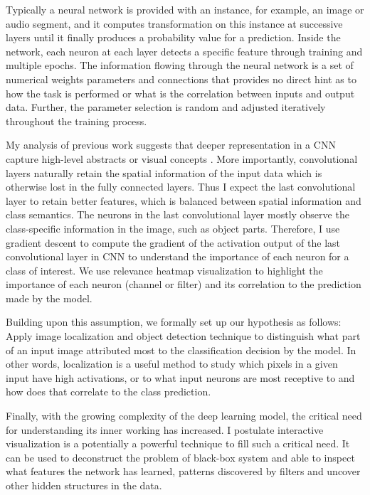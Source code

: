 Typically a neural network is provided with an instance, for example, an image or audio segment, and it computes transformation on this instance at successive layers until it finally produces a probability value for a prediction. Inside the network, each neuron at each layer detects a specific feature through training and multiple epochs. The information flowing through the neural network is a set of numerical weights parameters and connections that provides no direct hint as to how the task is performed or what is the correlation between inputs and output data. Further, the parameter selection is random and adjusted iteratively throughout the training process.

My analysis of previous work suggests that deeper representation in a CNN capture high-level abstracts or visual concepts \cite{Zeiler}. More importantly, convolutional layers naturally retain the spatial information of the input data which is otherwise lost in the fully connected layers. Thus I expect the last convolutional layer to retain better features, which is balanced between spatial information and class semantics. The neurons in the last convolutional layer mostly observe the class-specific information in the image, such as object parts. Therefore, I use gradient descent to compute the gradient of the activation output of the last convolutional layer in CNN to understand the importance of each neuron for a class of interest. We use relevance heatmap visualization to highlight the importance of each neuron (channel or filter) and its correlation to the prediction made by the model.

Building upon this assumption, we formally set up our hypothesis as follows: Apply image localization and object detection technique to distinguish what part of an input image attributed most to the classification decision by the model. In other words, localization is a useful method to study which pixels in a given input have high activations, or to what input neurons are most receptive to and how does that correlate to the class prediction.

Finally, with the growing complexity of the deep learning model, the critical need for understanding its inner working has increased. I postulate interactive visualization is a potentially a powerful technique to fill such a critical need. It can be used to deconstruct the problem of black-box system and able to inspect what features the network has learned, patterns discovered by filters and uncover other hidden structures in the data.

